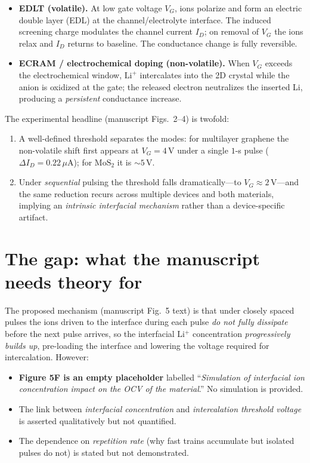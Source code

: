 \documentclass[11pt,a4paper]{article}
\newcommand{\Lip}{\ensuremath{\mathrm{Li^{+}}}}
\begin{document}
\begin{itemize}
\item \textbf{EDLT (volatile).} At low gate voltage $V_G$, ions polarize and form
an electric double layer (EDL) at the channel/electrolyte interface. The induced
screening charge modulates the channel current $I_D$; on removal of $V_G$ the
ions relax and $I_D$ returns to baseline. The conductance change is fully
reversible.
\item \textbf{ECRAM / electrochemical doping (non-volatile).} When $V_G$ exceeds
the electrochemical window, \Lip{} intercalates into the 2D crystal while the
anion is oxidized at the gate; the released electron neutralizes the inserted Li,
producing a \emph{persistent} conductance increase.
\end{itemize}

The experimental headline (manuscript Figs.~2--4) is twofold:
\begin{enumerate}
\item A well-defined threshold separates the modes: for multilayer graphene the
non-volatile shift first appears at $V_G=4$\,V under a single $1$-s pulse
($\Delta I_D=0.22\,\mu$A); for $\mathrm{MoS_2}$ it is ${\sim}5$\,V.
\item Under \emph{sequential} pulsing the threshold falls dramatically---to
$V_G\approx 2$\,V---and the same reduction recurs across multiple devices and
both materials, implying an \emph{intrinsic interfacial mechanism} rather than a
device-specific artifact.
\end{enumerate}

\section{The gap: what the manuscript needs theory for}
The proposed mechanism (manuscript Fig.~5 text) is that under closely spaced
pulses the ions driven to the interface during each pulse \emph{do not fully
dissipate} before the next pulse arrives, so the interfacial \Lip{}
concentration \emph{progressively builds up}, pre-loading the interface and
lowering the voltage required for intercalation. However:

\begin{itemize}
\item \textbf{Figure 5F is an empty placeholder} labelled ``\emph{Simulation of
interfacial ion concentration impact on the OCV of the material}.'' No
simulation is provided.
\item The link between \emph{interfacial concentration} and \emph{intercalation
threshold voltage} is asserted qualitatively but not quantified.
\item The dependence on \emph{repetition rate} (why fast trains accumulate but
isolated pulses do not) is stated but not demonstrated.
\end{itemize}
\end{document}
